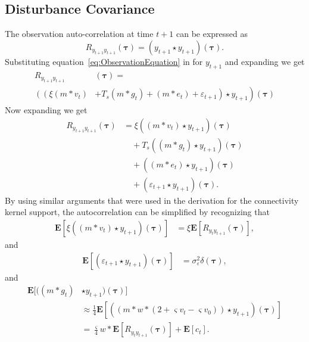 \documentclass[conference,onecolumn]{IEEEtran}
\begin{document}
\subsection{Disturbance Covariance}
The observation auto-correlation at time $t+1$ can be expressed as
\begin{equation}
	R_{y_{t+1}y_{t+1}}(\boldsymbol{\tau})=(y_{t+1} \star y_{t+1})(\boldsymbol\tau).
\end{equation}
Substituting equation~\ref{eq:ObservationEquation} in for $y_{t+1}$ and expanding we get
\begin{align}
	R_{y_{t+1}y_{t+1}} & (\boldsymbol{\tau}) = \\ \nonumber 
	\left( \left(\xi( m\ast v_{t}) \right.\right.&+\left.\left. T_s(m\ast g_{t}) + ( m \ast e_{t})+\varepsilon_{t+1} \right) \star y_{t+1} \right) (\boldsymbol{\tau})
\end{align}
Now expanding we get
\begin{align}\label{eq:expanded_auto_corr}
	R_{y_{t+1}y_{t+1}}(\boldsymbol{\tau}) &= \xi((m \ast v_{t}) \star y_{t+1})(\boldsymbol{\tau}) \nonumber \\
	&\quad+T_s((m\ast g_{t})\star y_{t+1})(\boldsymbol{\tau}) \nonumber \\
	&\quad+((m\ast e_{t})\star  y_{t+1})(\boldsymbol{\tau}) \nonumber \\
	&\quad+(\varepsilon_{t+1} \star y_{t+1})(\boldsymbol{\tau}).
\end{align}
By using similar arguments that were used in the derivation for the connectivity kernel support, the autocorrelation can be simplified by recognizing that
\begin{align}\label{eq:term1}
  \mathbf{E}[\xi((m\ast v_{t})\star y_{t+1})(\boldsymbol{\tau})]&=\xi \mathbf{E}[ R_{y_ty_{t+1}}(\boldsymbol{\tau})],
\end{align}
and
\begin{align}\label{eq:term2}
 \mathbf{E}[(\varepsilon_{t+1}\star y_{t+1})(\boldsymbol\tau)]&=\sigma_{\varepsilon}^2\delta(\boldsymbol{\tau}),
\end{align}
and
\begin{align}\label{eq:term3}
	\mathbf{E}[((m\ast g_t) &\star y_{t+1})(\boldsymbol\tau)] \\ 
	&\approx \frac{1}{4}\mathbf{E}[((m \ast w \ast (2 + \varsigma v_t - \varsigma v_0))\star y_{t+1})(\boldsymbol\tau)] \\
	&= \frac{\varsigma}{4} w \ast \mathbf{E}[R_{y_ty_{t+1}}(\boldsymbol\tau)]  + \mathbf{E}[c_t].
\end{align}
\end{document}
